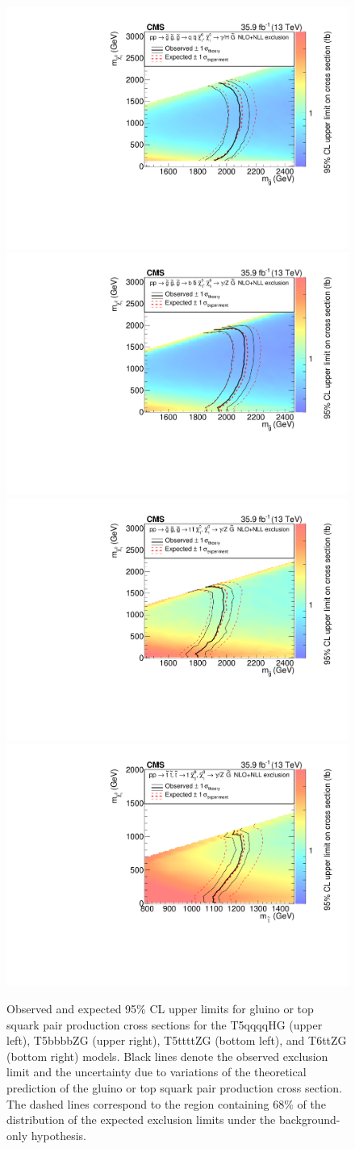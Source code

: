 \begin{figure}[htb!]
\centering
\includegraphics[width=0.48\linewidth]{../Figures/Chap4/Figure_005-a.pdf}
\includegraphics[width=0.48\linewidth]{../Figures/Chap4/Figure_005-b.pdf}\\
\includegraphics[width=0.48\linewidth]{../Figures/Chap4/Figure_005-c.pdf}
\includegraphics[width=0.48\linewidth]{../Figures/Chap4/Figure_005-d.pdf}
\captionsetup{width=.95\linewidth}
\caption[Exclusions for strong SMS models]{Observed and expected 95\% CL upper limits for gluino or top squark pair production cross sections
for the T5qqqqHG (upper left), T5bbbbZG (upper right), T5ttttZG (bottom left), and T6ttZG
(bottom right) models. Black lines denote the
observed exclusion limit and the uncertainty due to variations of the
theoretical prediction of the gluino or top squark pair production cross section.
The dashed lines correspond to the region containing 68\% of the distribution of
the expected exclusion limits under the background-only hypothesis.}
\label{fig:exclusions}
\end{figure}

